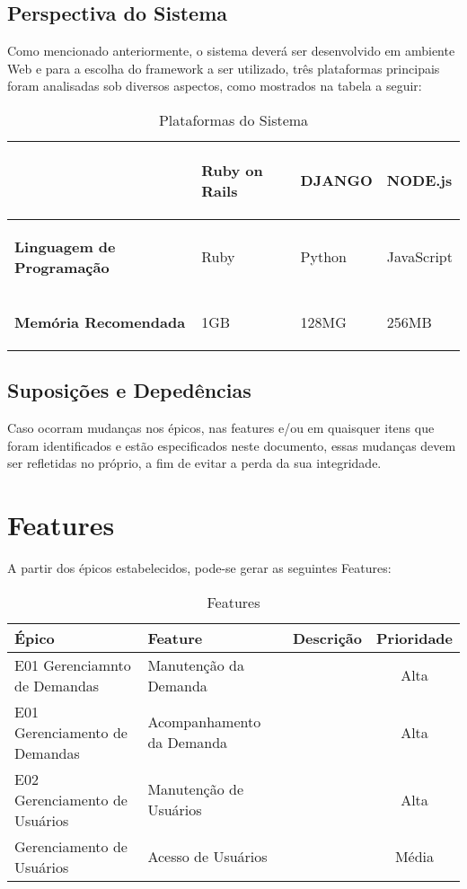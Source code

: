 \subsection{Perspectiva do Sistema}

Como mencionado anteriormente, o sistema deverá ser desenvolvido em ambiente Web e para a escolha do framework a ser utilizado, três plataformas principais foram analisadas sob diversos aspectos, como mostrados na tabela a seguir:

\begin{table}[H]
	\begin{tabular}{| m{4cm} | m{4cm} | m{4cm} | m{4cm} |}
		\hline
		& \begin{center} \textbf{Ruby on Rails} \end{center} & \begin{center} \textbf{DJANGO} \end{center} & \begin{center} \textbf{NODE.js} \end{center}\tabularnewline
		\hline
		\begin{center} \textbf{Linguagem de Programação} \end{center} & Ruby & Python & JavaScript\tabularnewline
		\hline
		\begin{center} \textbf{Memória Recomendada} \end{center} & 1GB & 128MG & 256MB\tabularnewline
		\hline
	\end{tabular}
	\caption{Plataformas do Sistema}
	\label{Plataformas_do_Sistema}
\end{table}

\subsection{Suposições e Depedências}

Caso ocorram mudanças nos épicos, nas features e/ou em quaisquer itens que foram identificados e estão especificados neste documento, essas mudanças devem ser refletidas no próprio, a fim de evitar a perda da sua integridade.

\section{Features}

A partir dos épicos estabelecidos, pode-se gerar as seguintes Features:

\begin{table}[H]
	\begin{tabular}{|>{\centering}p{4cm}|>{\centering}p{4cm}|>{\centering}p{6cm}|c|}
		\hline
		Épico & Feature & Descrição & Prioridade\tabularnewline
		\hline
		\hline
		E01 Gerenciamnto de Demandas & Manutenção da Demanda &  & Alta\tabularnewline
		\hline
		E01 Gerenciamento de Demandas & Acompanhamento da Demanda &  & Alta\tabularnewline
		\hline
		E02 Gerenciamento de Usuários & Manutenção de Usuários &  & Alta\tabularnewline
		\hline
		Gerenciamento de Usuários & Acesso de Usuários &  & Média\tabularnewline
		\hline
	\end{tabular}
	\caption{Features}
	\label{Features}
\end{table}

